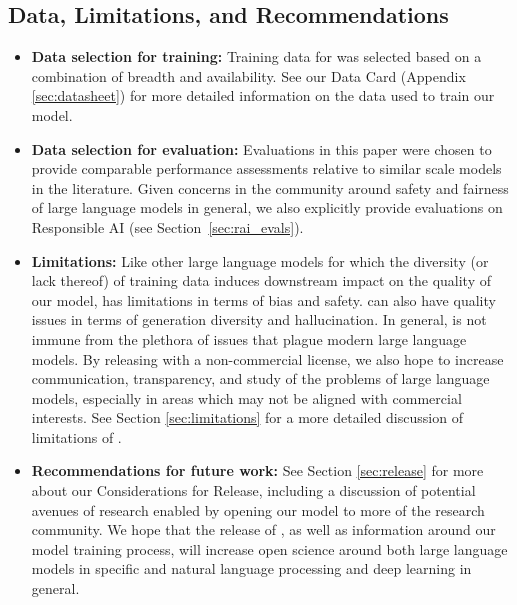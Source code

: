 \subsection{Data, Limitations, and Recommendations}
\begin{itemize}
    \item \textbf{Data selection for training:} Training data for \OPT{} was selected based on a combination of breadth and availability. See our Data Card (Appendix \ref{sec:datasheet}) for more detailed information on the data used to train our model. 
    \item \textbf{Data selection for evaluation:} Evaluations in this paper were chosen to provide comparable performance assessments relative to similar scale models in the literature. Given concerns in the community around safety and fairness of large language models in general, we also explicitly provide evaluations on Responsible AI (see Section~\ref{sec:rai_evals}). 
    \item \textbf{Limitations:} Like other large language models for which the diversity (or lack thereof) of training data induces downstream impact on the quality of our model, \OPT{} has limitations in terms of bias and safety. \OPT{} can also have quality issues in terms of generation diversity and hallucination. In general, \OPT{} is not immune from the plethora of issues that plague modern large language models. By releasing with a non-commercial license, we also hope to increase communication, transparency, and study of the problems of large language models, especially in areas which may not be aligned with commercial interests. See Section \ref{sec:limitations} for a more detailed discussion of limitations of \OPT{}. 
    \item \textbf{Recommendations for future work:} See Section \ref{sec:release} for more about our Considerations for Release, including a discussion of potential avenues of research enabled by opening our model to more of the research community. We hope that the release of \OPT{}, as well as information around our model training process, will increase open science around both large language models in specific and natural language processing and deep learning in general.
\end{itemize}
 


